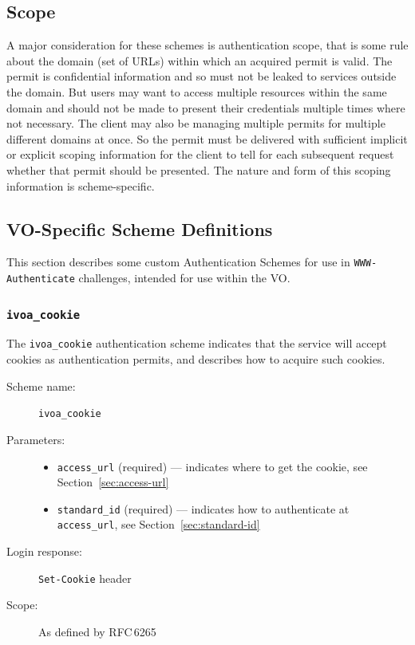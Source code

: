 \documentclass[11pt,a4paper]{ivoa}
\newcommand{\rfc}[1]{RFC\,#1}
\newcommand{\header}[1]{{\tt #1}}
\begin{document}
\subsection{Scope}\label{sec:scope}

A major consideration for these schemes is authentication scope,
that is some rule about the domain (set of URLs) within which an
acquired permit is valid.
The permit is confidential information and so must not be leaked to services
outside the domain.
But users may want to access multiple resources within the same domain
and should not be made to present their credentials
multiple times where not necessary.
The client may also be managing multiple permits
for multiple different domains at once.
So the permit must be delivered with sufficient
implicit or explicit scoping
information for the client to tell for each subsequent request
whether that permit should be presented.
The nature and form of this scoping information is scheme-specific.



\subsection{VO-Specific Scheme Definitions}\label{sec:voschemes}

This section describes some custom Authentication Schemes
for use in \header{WWW-Authenticate} challenges,
intended for use within the VO.

\subsubsection{\mbox{\tt ivoa\_cookie}}\label{sec:ivoa-cookie}

The \verb|ivoa_cookie| authentication scheme indicates that the service
will accept cookies as authentication permits,
and describes how to acquire such cookies.

\begin{description}
  \item[Scheme name:] \verb|ivoa_cookie|
  \item[Parameters:] \mbox{}
  \begin{itemize}
    \item \verb|access_url| (required) ---
          indicates where to get the cookie,
          see Section~\ref{sec:access-url}
    \item \verb|standard_id| (required) ---
          indicates how to authenticate at \verb|access_url|,
          see Section~\ref{sec:standard-id}
  \end{itemize}
  \item[Login response:] \header{Set-Cookie} header
  \item[Scope:] As defined by \rfc{6265}
\end{description}
\end{document}
